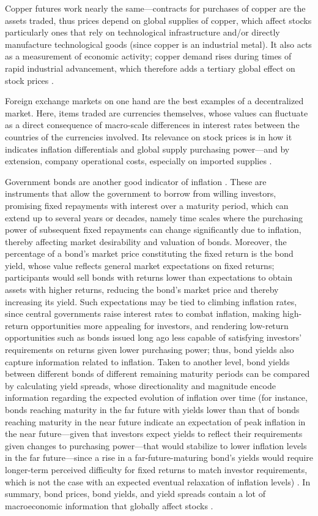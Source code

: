 \documentclass[stu,floatsintext]{apa7}
\begin{document}
Copper futures work nearly the same—contracts for purchases of copper are the assets traded, thus prices depend on global supplies of copper, which affect stocks particularly ones that rely on technological infrastructure and/or directly manufacture technological goods (since copper is an industrial metal). It also acts as a measurement of economic activity; copper demand rises during times of rapid industrial advancement, which therefore adds a tertiary global effect on stock prices \parencite{ahn2019commodities}.

Foreign exchange markets on one hand are the best examples of a decentralized market. Here, items traded are currencies themselves, whose values can fluctuate as a direct consequence of macro-scale differences in interest rates between the countries of the currencies involved. Its relevance on stock prices is in how it indicates inflation differentials and global supply purchasing power—and by extension, company operational costs, especially on imported supplies \parencite{phylaktis2005fx}.

Government bonds are another good indicator of inflation \parencite{mishkin2018economics}. These are instruments that allow the government to borrow from willing investors, promising fixed repayments with interest over a maturity period, which can extend up to several years or decades, namely time scales where the purchasing power of subsequent fixed repayments can change significantly due to inflation, thereby affecting market desirability and valuation of bonds. Moreover, the percentage of a bond's market price constituting the fixed return is the bond yield, whose value reflects general market expectations on fixed returns; participants would sell bonds with returns lower than expectations to obtain assets with higher returns, reducing the bond's market price and thereby increasing its yield. Such expectations may be tied to climbing inflation rates, since central governments raise interest rates to combat inflation, making high-return opportunities more appealing for investors, and rendering low-return opportunities such as bonds issued long ago less capable of satisfying investors' requirements on returns given lower purchasing power; thus, bond yields also capture information related to inflation. Taken to another level, bond yields between different bonds of different remaining maturity periods can be compared by calculating yield spreads, whose directionality and magnitude encode information regarding the expected evolution of inflation over time (for instance, bonds reaching maturity in the far future with yields lower than that of bonds reaching maturity in the near future indicate an expectation of peak inflation in the near future—given that investors expect yields to reflect their requirements given changes to purchasing power—that would stabilize to lower inflation levels in the far future—since a rise in a far-future-maturing bond's yields would require longer-term perceived difficulty for fixed returns to match investor requirements, which is not the case with an expected eventual relaxation of inflation levels) \parencite{fabozzi2026bonds}. In summary, bond prices, bond yields, and yield spreads contain a lot of macroeconomic information that globally affect stocks \parencite{baele2010bonds}.
\end{document}
